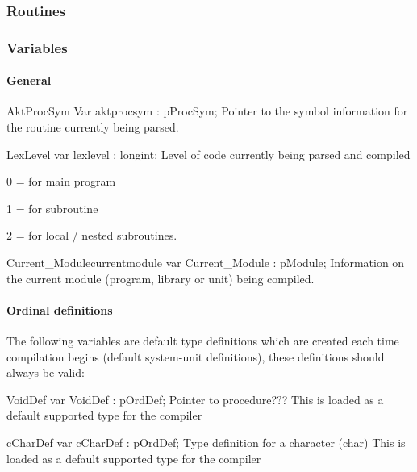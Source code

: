 \documentclass [a4paper,12pt]{article}
\begin{document}
\subsubsection{Routines}
\label{subsubsec:routinesnterfaceecla}

\subsubsection{Variables}
\label{subsubsec:variablesterfaceecla}

\paragraph{General}

\begin{variable}{AktProcSym}
\Declaration
Var aktprocsym : pProcSym;
\Description
Pointer to the symbol information for the routine currently being parsed.
\end{variable}

\begin{variable}{LexLevel}
\Declaration
var lexlevel : longint;
\Description
Level of code currently being parsed and compiled  \par 0 = for main program
\par 1 = for subroutine \par 2 = for local / nested subroutines.
\end{variable}

\begin{variablel}{Current{\_}Module}{currentmodule}
\Declaration
var Current{\_}Module : pModule;
\Description
Information on the current module (program, library or unit) being compiled.
\end{variablel}

\paragraph{Ordinal definitions}

The following variables are default type definitions which are created each
time compilation begins (default system-unit definitions), these definitions
should always be valid:

\begin{variable}{VoidDef}
\Declaration
var VoidDef : pOrdDef;
\Description
Pointer to procedure???
\Notes
This is loaded as a default supported type for the compiler
\end{variable}

\begin{variable}{cCharDef}
\Declaration
var cCharDef : pOrdDef;
\Description
Type definition for a character (\textsf{char})
\Notes
This is loaded as a default supported type for the compiler
\end{variable}
\end{document}
